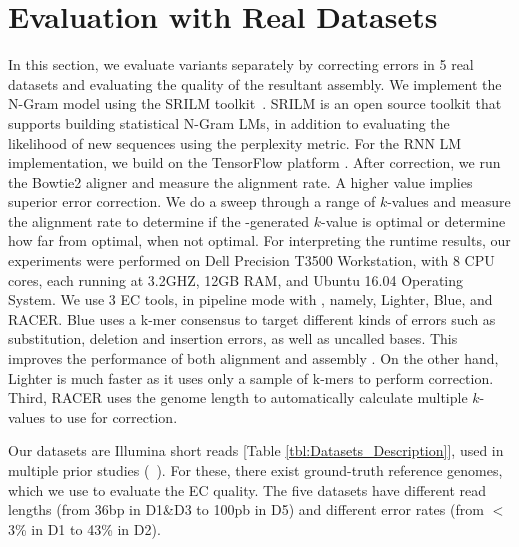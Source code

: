 \vspace{-5pt}
\section{Evaluation with Real Datasets}
\label{sec:evaluation-real}

In this section, we evaluate \name variants separately by correcting errors in 5 real datasets and evaluating the quality of the resultant assembly. We implement the N-Gram model using the SRILM toolkit~\cite{Stolcke02srilm--}. SRILM is an open source toolkit that supports building statistical N-Gram LMs, in addition to evaluating the likelihood of new sequences using the perplexity metric. For the RNN LM implementation, we build on the TensorFlow platform \cite{45381}.
After correction, we run the Bowtie2 aligner \cite{langmead2012fast} and measure the alignment rate. A higher value implies superior error correction. We do a sweep through a range of $k$-values and measure the alignment rate to determine if the \name-generated $k$-value is optimal or determine how far from optimal, when not optimal. For interpreting the runtime results, our experiments were performed on Dell Precision T3500 Workstation, with 8 CPU cores, each running at 3.2GHZ, 12GB RAM, and Ubuntu 16.04 Operating System.
We use 3 EC tools, in pipeline mode with \name, namely, Lighter, Blue, and RACER. Blue uses a k-mer consensus to target different kinds of errors such as substitution, deletion and insertion errors, as well as uncalled bases. This improves the performance of both alignment and assembly \cite{greenfield2014blue}. On the other hand, Lighter is much faster as it uses only a sample of k-mers to perform correction. %
Third, RACER uses the genome length to automatically calculate multiple $k$-values to use for correction.

Our datasets are Illumina short reads [Table \ref{tbl:Datasets_Description}], used in multiple prior studies (\eg~\cite{yang2010reptile, doi:10.1093/bioinformatics/btp379}). For these, there exist ground-truth reference genomes, which we use to evaluate the EC quality. %
The five datasets have different read lengths (from 36bp in D1\&D3 to 100pb in D5) and different error rates (from $<$ 3\% in D1 to 43\% in D2).  

